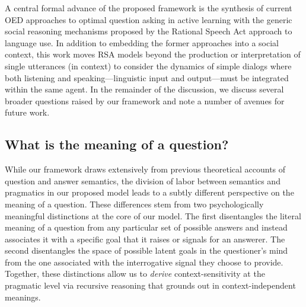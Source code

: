 \documentclass[11pt, floatsintext]{apa6}
\begin{document}
A central formal advance of the proposed framework is the synthesis of current OED approaches to optimal question asking in active learning with the generic social reasoning mechanisms proposed by the Rational Speech Act approach to language use. 
In addition to embedding the former approaches into a social context, this work moves RSA models beyond the production or interpretation of single utterances (in context) to consider the dynamics of simple dialogs where both listening and speaking---linguistic input and output---must be integrated within the same agent. 
In the remainder of the discussion, we discuss several broader questions raised by our framework and note a number of avenues for future work.

\subsection{What is the meaning of a question?}

While our framework draws extensively from previous theoretical accounts of question and answer semantics, the division of labor between semantics and pragmatics in our proposed model leads to a subtly different perspective on the meaning of a question. 
These differences stem from two psychologically meaningful distinctions at the core of our model.
The first disentangles the literal meaning of a question from any particular set of possible answers and instead associates it with a specific goal that it raises or signals for an answerer.
The second disentangles the space of possible latent goals in the questioner's mind from the one associated with the interrogative signal they choose to provide.
Together, these distinctions allow us to \emph{derive} context-sensitivity at the pragmatic level via recursive reasoning that grounds out in context-independent meanings.
\end{document}
